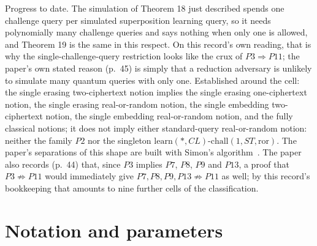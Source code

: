 \documentclass{aicr-conjecture}
\newcommand{\ror}{\mathrm{ror}}
\newcommand{\learn}{\mathrm{learn}}
\newcommand{\chall}{\mathrm{chall}}
\begin{document}
Progress to date. The simulation of Theorem 18 just described spends one
challenge query per simulated superposition learning query, so it needs
polynomially many challenge queries and says nothing when only one is
allowed, and Theorem 19 is the same in this respect. On this record's
own reading, that is why the single-challenge-query restriction looks
like the crux of $P3\Rightarrow P11$; the
paper's own stated reason (p.~45) is simply that a reduction adversary
is unlikely to simulate many quantum queries with only one. Established
around the cell: the single erasing two-ciphertext notion implies the
single erasing one-ciphertext notion, the single erasing real-or-random
notion, the single embedding two-ciphertext notion, the single embedding
real-or-random notion, and the fully classical notions; it does not
imply either standard-query real-or-random notion: neither the family
$P2$ nor the singleton $\learn(*,CL)$-$\chall(1,ST,\ror)$. The paper's
separations of this shape are built with Simon's algorithm~\cite{Sim97}.
The paper also records (p.~44) that, since $P3$ implies $P7$, $P8$, $P9$
and $P13$, a proof that $P3\not\Rightarrow P11$ would immediately give
$P7, P8, P9, P13\not\Rightarrow P11$ as well; by this record's
bookkeeping that amounts to nine further cells of the classification.

\section{Notation and parameters}\label{sec:notation}
\end{document}
